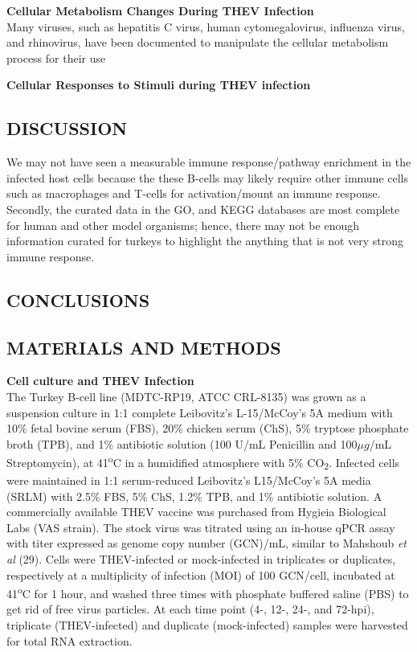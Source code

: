 \documentclass[
]{article}
\begin{document}
\textbf{Cellular Metabolism Changes During THEV Infection}\\
Many viruses, such as hepatitis C virus, human cytomegalovirus,
influenza virus, and rhinovirus, have been documented to manipulate the
cellular metabolism process for their use

\textbf{Cellular Responses to Stimuli during THEV infection}\\
\newpage

\subsection{DISCUSSION}\label{discussion}

We may not have seen a measurable immune response/pathway enrichment in
the infected host cells because the these B-cells may likely require
other immune cells such as macrophages and T-cells for activation/mount
an immune response. Secondly, the curated data in the GO, and KEGG
databases are most complete for human and other model organisms; hence,
there may not be enough information curated for turkeys to highlight the
anything that is not very strong immune response. \newpage

\subsection{CONCLUSIONS}\label{conclusions}

\newpage

\subsection{MATERIALS AND METHODS}\label{materials-and-methods}

\textbf{Cell culture and THEV Infection}\\
The Turkey B-cell line (MDTC-RP19, ATCC CRL-8135) was grown as a
suspension culture in 1:1 complete Leibovitz's L-15/McCoy's 5A medium
with 10\% fetal bovine serum (FBS), 20\% chicken serum (ChS), 5\%
tryptose phosphate broth (TPB), and 1\% antibiotic solution (100 U/mL
Penicillin and 100\(\mu g\)/mL Streptomycin), at 41\textsuperscript{o}C
in a humidified atmosphere with 5\% CO\textsubscript{2}. Infected cells
were maintained in 1:1 serum-reduced Leibovitz's L15/McCoy's 5A media
(SRLM) with 2.5\% FBS, 5\% ChS, 1.2\% TPB, and 1\% antibiotic solution.
A commercially available THEV vaccine was purchased from Hygieia
Biological Labs (VAS strain). The stock virus was titrated using an
in-house qPCR assay with titer expressed as genome copy number (GCN)/mL,
similar to Mahshoub \emph{et al} (29). Cells were THEV-infected or
mock-infected in triplicates or duplicates, respectively at a
multiplicity of infection (MOI) of 100 GCN/cell, incubated at
41\textsuperscript{o}C for 1 hour, and washed three times with phosphate
buffered saline (PBS) to get rid of free virus particles. At each time
point (4-, 12-, 24-, and 72-hpi), triplicate (THEV-infected) and
duplicate (mock-infected) samples were harvested for total RNA
extraction.
\end{document}
